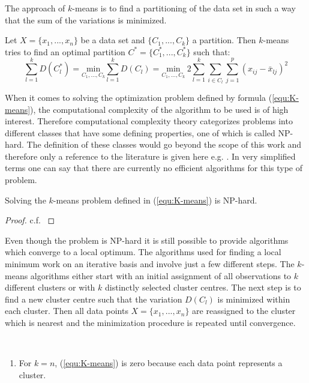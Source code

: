 The approach of $k$-means is to find a partitioning of the data set in such a way that the sum of the variations is minimized.

\begin{definition}[$k$-means]
Let $X = \{x_1, ..., x_n\}$ be a data set and $\{C_1, ..., C_k\}$ a partition. Then $k$-means tries to find an optimal partition $C^* = \{C_1^*, ..., C_k^*\}$ such that: 
	\begin{equation}\label{equ:K-means}
		\sum_{l=1}^k D(C_l^*) = \underset{C_1, \dots, C_k}{\text{min}} \sum_{l=1}^k D(C_l) = \underset{C_1, \dots, C_k}{\text{min}} ~2 \sum_{l=1}^k  \sum_{i \in C_l} \sum_{j=1}^p (x_{ij}- \bar x_{lj})^2
	\end{equation}
\end{definition}

When it comes to solving the optimization problem defined by formula (\ref{equ:K-means}), the computational complexity of the algorithm to be used is of high interest. Therefore computational complexity theory categorizes problems into different classes that have some defining properties, one of which is called NP-hard. The definition of these classes would go beyond the scope of this work and therefore only a reference to the literature is given here e.g. \cite{np_hard_reference}. In very simplified terms one can say that there are currently no efficient algorithms for this type of problem. 


\begin{corollary}
	Solving the $k$-means problem defined in (\ref{equ:K-means}) is NP-hard.
\end{corollary}
\begin{proof}
c.f. \cite{NP_hard}
\end{proof}

Even though the problem is NP-hard it is still possible to provide algorithms which converge to a local optimum. The algorithms used for finding a local minimum work on an iterative basis   and involve just a few different steps. The $k$-means algorithms either start with an initial assignment of all observations to $k$ different clusters or with $k$ distinctly selected cluster centres. The next step is to find a new cluster centre such that the variation $D(C_l)$ is minimized within each cluster. Then all data points $X = \{x_1, ..., x_n\}$ are reassigned to the cluster which is nearest and the minimization procedure is repeated until convergence. 

\begin{remark}~	
	\begin{enumerate}[label=(\roman*)]
		\item  For $k=n$, (\ref{equ:K-means}) is zero because each data point represents a cluster. 
	\end{enumerate}
\end{remark}

